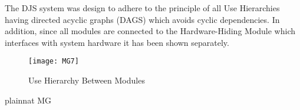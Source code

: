 \documentclass[12pt, titlepage]{article}
\begin{document}
The DJS system was design to adhere to the principle of all Use Hierarchies having directed acyclic graphs (DAGS) which avoids cyclic dependencies. In addition, since all modules are connected to the Hardware-Hiding Module which interfaces with system hardware it has been shown separately.
\begin{figure}[H]
\centering
\texttt{[image: MG7]}
\caption{Use Hierarchy Between Modules}
\label{FigUH}
\end{figure}




 {plainnat}
 {MG}
\end{document}
